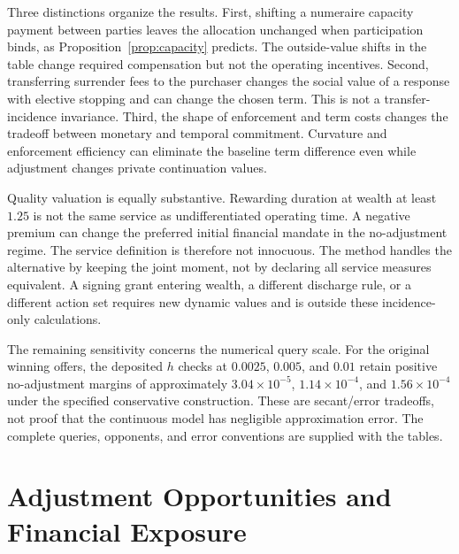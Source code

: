 Three distinctions organize the results. First, shifting a numeraire capacity payment between parties leaves the allocation unchanged when participation binds, as Proposition~\ref{prop:capacity} predicts. The outside-value shifts in the table change required compensation but not the operating incentives. Second, transferring surrender fees to the purchaser changes the social value of a response with elective stopping and can change the chosen term. This is not a transfer-incidence invariance. Third, the shape of enforcement and term costs changes the tradeoff between monetary and temporal commitment. Curvature and enforcement efficiency can eliminate the baseline term difference even while adjustment changes private continuation values.

Quality valuation is equally substantive. Rewarding duration at wealth at least $1.25$ is not the same service as undifferentiated operating time. A negative premium can change the preferred initial financial mandate in the no-adjustment regime. The service definition is therefore not innocuous. The method handles the alternative by keeping the joint moment, not by declaring all service measures equivalent. A signing grant entering wealth, a different discharge rule, or a different action set requires new dynamic values and is outside these incidence-only calculations.

The remaining sensitivity concerns the numerical query scale. For the original winning offers, the deposited $h$ checks at $0.0025$, $0.005$, and $0.01$ retain positive no-adjustment margins of approximately $3.04\times10^{-5}$, $1.14\times10^{-4}$, and $1.56\times10^{-4}$ under the specified conservative construction. These are secant/error tradeoffs, not proof that the continuous model has negligible approximation error. The complete queries, opponents, and error conventions are supplied with the tables.

\section{Adjustment Opportunities and Financial Exposure}
\label{sec:mechanism}
